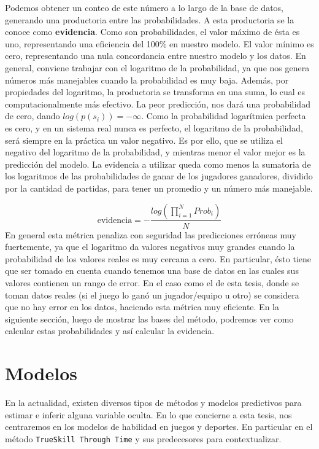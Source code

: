 \documentclass[11pt,twoside, spanish]{report} %
\begin{document}
Podemos obtener un conteo de este n\'umero a lo largo de la base de datos, generando una productoria entre las probabilidades.
A esta productoria se la conoce como \textbf{evidencia}. %
Como son probabilidades, el valor m\'aximo de \'esta es uno, representando una eficiencia del 100\% en nuestro modelo.
El valor m\'inimo es cero, representando una nula concordancia entre nuestro modelo y los datos.
En general, conviene trabajar con el logaritmo de la probabilidad, ya que nos genera n\'umeros m\'as manejables cuando la probabilidad es muy baja.
Adem\'as, por propiedades del logaritmo, la productoria se transforma en una suma, lo cual es  computacionalmente m\'as efectivo.
La peor predicci\'on, nos dar\'a una probabilidad de cero, dando $log(p(s_i))=-\infty$.
Como la probabilidad logar\'itmica perfecta es cero, y en un sistema real nunca es perfecto, el logaritmo de la probabilidad, ser\'a siempre en la pr\'actica un valor negativo.
Es por ello, que se utiliza el negativo del logaritmo de la probabilidad, y mientras menor el valor mejor es la predicci\'on del modelo.
La evidencia a utilizar queda como menos la sumatoria de los logaritmos de las probabilidades de ganar de los jugadores ganadores, dividido por la cantidad de partidas, para tener un promedio y un n\'umero m\'as manejable.


\begin{equation}
	\text{evidencia} = -\frac{log(\prod_{i=1}^{N}Prob_i)}{N}
\end{equation}
En general esta m\'etrica penaliza con seguridad las predicciones err\'oneas muy fuertemente, ya que el logaritmo da valores negativos muy grandes cuando la probabilidad de los valores reales es muy cercana a cero.
En particular, \'esto tiene que ser tomado en cuenta cuando tenemos una base de datos en las cuales sus valores contienen un rango de error.
En el caso como el de esta tesis, donde se toman datos reales (si el juego lo gan\'o un jugador/equipo u otro) se considera que no hay error en los datos, haciendo esta m\'etrica muy eficiente.
En la siguiente secci\'on, luego de mostrar las bases del m\'etodo, podremos ver como calcular estas probabilidades y as\'i calcular la evidencia.


\section{Modelos}


En la actualidad, existen diversos tipos de m\'etodos y modelos predictivos para estimar e inferir alguna variable oculta.
En lo que concierne a esta tesis, nos centraremos en los modelos de habilidad en juegos y deportes. En particular en el m\'etodo \texttt{TrueSkill Through Time} y sus predecesores para contextualizar.
\end{document}
